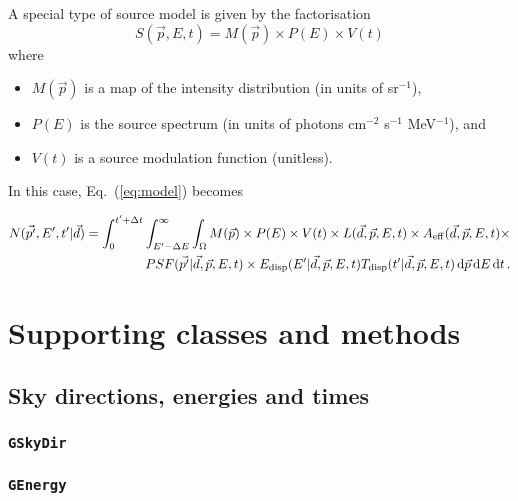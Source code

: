 \documentclass{article}[12pt,a4]
\begin{document}
A special type of source model is given by the factorisation
\begin{equation}
S(\vec{p}, E, t) = M(\vec{p}) \times P(E) \times V(t)
\end{equation}
where
\begin{itemize}
\item[] $M(\vec{p})$ is a map of the intensity distribution (in units of sr$^{-1}$),
\item[] $P(E)$ is the source spectrum (in units of photons cm$^{-2}$ s$^{-1}$ MeV$^{-1}$), and
\item[] $V(t)$ is a source modulation function (unitless).
\end{itemize}
In this case, Eq.~(\ref{eq:model}) becomes

\begin{eqnarray}
N(\vec{p'}, E', t' | \vec{d}) = \int_{0}^{t'+\Delta t} \int_{E'-\Delta E}^{\infty} \int_{\Omega} 
M(\vec{p}) \times P(E) \times V(t) \times 
L(\vec{d}, \vec{p}, E, t) \times
A_{\rm eff}(\vec{d}, \vec{p}, E, t) \times \nonumber \\
PSF(\vec{p'} | \vec{d}, \vec{p}, E, t) \times
E_{\rm disp}(E' | \vec{d}, \vec{p}, E, t) 
T_{\rm disp}(t' | \vec{d}, \vec{p}, E, t) 
\, {\rm d}\vec{p} \, {\rm d}E \, {\rm d}t \, .
\end{eqnarray}




\section{Supporting classes and methods}

\subsection{Sky directions, energies and times}

\subsubsection{{\tt GSkyDir}}
\label{sec:GSkyDir}

\subsubsection{{\tt GEnergy}}
\label{sec:GEnergy}
\end{document}
